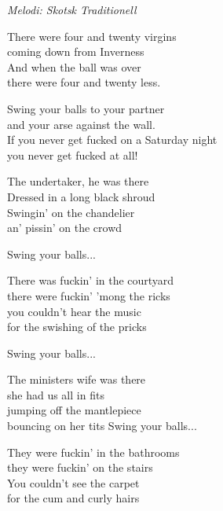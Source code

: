 {\footnotesize\textit{Melodi: Skotsk Traditionell}}\par
\vspace{10pt}
There were four and twenty virgins\\
coming down from Inverness\\
And when the ball was over\\
there were four and twenty less.\par
\vspace{10pt}
Swing your balls to your partner\\
and your arse against the wall.\\
If you never get fucked on a Saturday night\\
you never get fucked at all!\par
\vspace{10pt}
The undertaker, he was there\\
Dressed in a long black shroud\\
Swingin' on the chandelier\\
an' pissin' on the crowd\par
\vspace{10pt}
Swing your balls...\par
\vspace{10pt}
There was fuckin' in the courtyard\\
there were fuckin' 'mong the ricks\\
you couldn't hear the music\\
for the swishing of the pricks\par
\vspace{10pt}
Swing your balls...\par
\vspace{10pt}
The ministers wife was there\\
she had us all in fits\\
jumping off the mantlepiece\\
bouncing on her tits
\newpage
Swing your balls...\par
\vspace{10pt}
They were fuckin' in the bathrooms\\
they were fuckin' on the stairs\\
You couldn't see the carpet \\
for the cum and curly hairs\par
\vspace{10pt}
